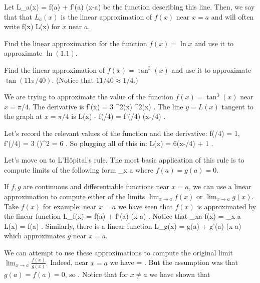 \documentclass[11pt]{amsart}
\begin{document}
Let 
\beqn
L_a(x) = f(a) + f'(a) (x-a)
\eeqn
be the function describing this line.
Then, we say that that $L_a(x)$ is the linear approximation of $f(x)$ near $x=a$ and will often write
\beqn
f(x) \approx L(x)
\eeqn
for $x$ near $a$.

\begin{eg} 
Find the linear approximation for the function $f(x) = \ln x$ and use it to approximate $\ln(1.1)$. 
\end{eg}

\vspace{4cm}

\begin{eg}
Find the linear approximation of $f(x) = \tan^3 (x)$ and use it to approximate $\tan(11 \pi/40)$. 
(Notice that $11/40 \approx 1/4$.)
\end{eg}

\vspace{5cm} 

We are trying to approximate the value of the function $f(x)=\tan^3(x)$ near $x=\pi/4$. 
The derivative is
\beqn
f'(x) = 3 \tan^2(x) \sec^2(x) .
\eeqn
The line $y=L(x)$ tangent to the graph at $x=\pi/4$ is 
\beqn
L(x) - f(\pi/4) = f'(\pi/4) (x-\pi/4) .
\eeqn

Let's record the relevant values of the function and the derivative:
\beqn
f(\pi/4) = 1, \quad f'(\pi/4) = 3  \cdot ()^2 = 6 .
\eeqn
So plugging all of this in:
\beqn
L(x) = 6(x-\pi/4) + 1 .
\eeqn


\newpage

Let's move on to L'H\^{o}pital's rule. 
The most basic application of this rule is to compute limits of the following form
\beqn
\lim_{x \to a} 
\eeqn
where $f(a) = g(a) = 0$.

If $f,g$ are continuous and differentiable functions near $x=a$, we can use a linear approximation to compute either of the limits $\lim_{x \to a} f(x)$ or $\lim_{x\to a} g(x)$. 
Take $f(x)$ for example: near $x=a$ we have seen that $f(x)$ is approximated by the linear function
\beqn
L_f(x) = f(a) + f'(a) (x-a) .
\eeqn
Notice that 
\beqn
\lim_{x\to a} f(x) = \lim_{x \to a} L(x) = f(a) .
\eeqn
Similarly, there is a linear function 
\beqn
L_g(x) = g(a) + g'(a) (x-a) 
\eeqn
which approximates $g$ near $x=a$. 

We can attempt to use these approximations to compute the original limit $\lim_{x \to a} \frac{f(x)}{g(x)}.$
Indeed, near $x=a$ we have
\beqn
{} \approx {} =  .
\eeqn
But the assumption was that $g(a) = f(a) = 0$, so
\beqn
{} \approx {} .
\eeqn
Notice that for $x\ne a$ we have shown that 
\beqn
{} \approx {} 
\eeqn 
\end{document}
